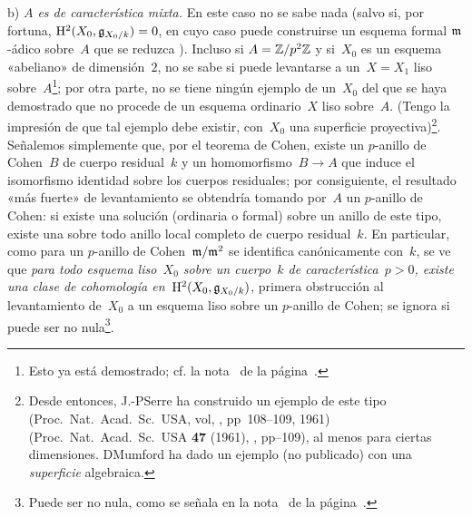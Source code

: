 \medskip
\noindent b) \emph{$A$ es de característica mixta.} En este caso no se sabe nada (salvo si, por fortuna, $\mathrm H^2(X_0,\mathfrak{g}_{X_0/k})=0$, en cuyo caso puede construirse un esquema formal $\mathfrak{m}$-ádico
sobre~$A$ que se reduzca
). Incluso si $A=\mathbb Z/p^2\mathbb Z$ y si~$X_0$ es un esquema «abeliano» de dimensión~$2$, no se sabe si puede levantarse a un~$X=X_1$ liso sobre~$A$\kern1pt\footnote{Esto ya está demostrado; cf. la nota~ de la página~\pageref{III.6.6.p24}.}; por otra parte, no se tiene ningún ejemplo de un~$X_0$ del que se haya demostrado que no procede de un esquema ordinario~$X$ liso sobre~$A$. (Tengo la impresión de que tal ejemplo debe existir, con~$X_0$ una superficie proyectiva)\footnote{\label{nIII.3}Desde entonces, J.-P\ptbl Serre ha construido un ejemplo de este tipo
{(Proc.\ Nat.\ Acad.\ Sc.\ USA, vol, , pp~108--109, 1961)}
{(Proc.\ Nat.\ Acad.\ Sc.\ USA \textbf{47} (1961), , pp--109)}, al menos para ciertas dimensiones. D\ptbl Mumford ha dado un ejemplo (no publicado) con una \emph{superficie} algebraica.}. Señalemos simplemente que, por el teorema de Cohen, existe un $p$-anillo de Cohen~$B$ de cuerpo residual~$k$ y un homomorfismo~$B\to A$ que induce el isomorfismo identidad sobre los cuerpos residuales; por consiguiente, el resultado «más fuerte» de levantamiento se obtendría tomando por~$A$
un $p$-anillo de Cohen: si existe una solución (ordinaria o formal) sobre un anillo de este tipo, existe una sobre todo anillo local completo de cuerpo residual~$k$. En particular, como para un $p$-anillo de Cohen~$\mathfrak{m}/\mathfrak{m}^2$ se identifica canónicamente con~$k$, se ve que \emph{para todo esquema liso~$X_0$ sobre un cuerpo~$k$ de característica~$p>0$, existe una clase de cohomología en~$\mathrm H^2(X_0,\mathfrak{g}_{X_0/k})$}, primera obstrucción al levantamiento de~$X_0$ a un esquema liso sobre un $p$-anillo de Cohen; se ignora si puede ser no nula\footnote{Puede ser no nula, como se señala en la nota~ de la página~\pageref{nIII.3}.}.

